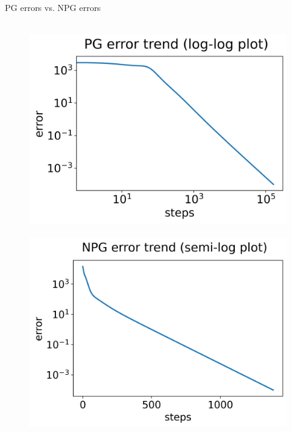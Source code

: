 \documentclass[10pt, aspectratio=169, compress, protectframetitle, handout]{beamer}
\begin{document}
\begin{frame}{PG errors vs. NPG errors}

    \begin{figure}
        \centering
        \mbox{
            \hspace*{-10pt}\includegraphics[scale=0.5]{figures/errors_log_log_PG.png}
            \hspace*{-5pt}\includegraphics[scale=0.5]{figures/errors_log_NPG.png}
        }
    \end{figure}
    
\end{frame}
\end{document}
